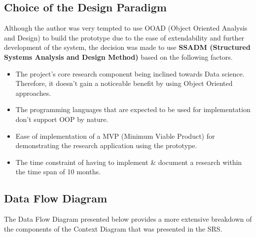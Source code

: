 \subsection{Choice of the Design Paradigm}
Although the author was very tempted to use OOAD (Object Oriented Analysis and Design) to build the prototype due to the ease of extendability and further development of the system, the decision was made to use \textbf{SSADM (Structured Systems Analysis and Design Method)} based on the following factors.
\begin{itemize}
\item The project's core research component being inclined towards Data science. Therefore, it doesn't gain a noticeable benefit by using Object Oriented approaches.
\item The programming languages that are expected to be used for implementation don't support OOP by nature.
\item Ease of implementation of a MVP (Minimum Viable Product) for demonstrating the research application using the prototype.
\item The time constraint of having to implement \& document a research within the time span of 10 months.
\end{itemize}



\subsection{Data Flow Diagram}

The Data Flow Diagram presented below provides a more extensive breakdown of the components of the Context Diagram that was presented in the SRS.

